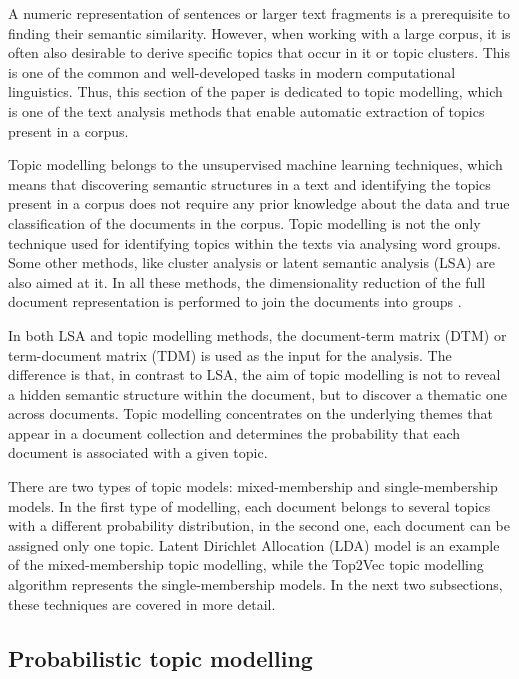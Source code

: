 \documentclass[fontsize=12pt,a4paper,twoside,openany]{scrbook}
\begin{document}
A numeric representation of sentences or larger text fragments is a prerequisite to finding their semantic similarity. However, when working with a large corpus, it is often also desirable to derive specific topics that occur in it or topic clusters. This is one of the common and well-developed tasks in modern computational linguistics. Thus, this section of the paper is dedicated to topic modelling, which is one of the text analysis methods that enable automatic extraction of topics present in a corpus.

Topic modelling belongs to the unsupervised machine learning techniques, which means that discovering semantic structures in a text and identifying the topics present in a corpus does not require any prior knowledge about the data and true classification of the documents in the corpus. Topic modelling is not the only technique used for identifying topics within the texts via analysing word groups. Some other methods, like cluster analysis or latent semantic analysis (LSA) \parencite[see][]{Foltz96, Landauer2007} are also aimed at it. In all these methods, the dimensionality reduction of the full document representation is performed to join the documents into groups \parencite{Anandarajan18}. 

In both LSA and topic modelling methods, the document-term matrix (DTM) or term-document matrix (TDM) is used as the input for the analysis. The difference is that, in contrast to LSA, the aim of topic modelling is not to reveal a hidden semantic structure within the document, but to discover a thematic one across documents. Topic modelling concentrates on the underlying themes that appear in a document collection and determines the probability that each document is associated with a given topic. 

There are two types of topic models: mixed-membership and single-membership models. In the first type of modelling, each document belongs to several topics with a different probability distribution, in the second one, each document can be assigned only one topic. Latent Dirichlet Allocation (LDA) model is an example of the mixed-membership topic modelling, while the Top2Vec topic modelling algorithm represents the single-membership models. In the next two subsections, these techniques are covered in more detail.

\subsection{Probabilistic topic modelling}
\label{sec:lda}
\end{document}
